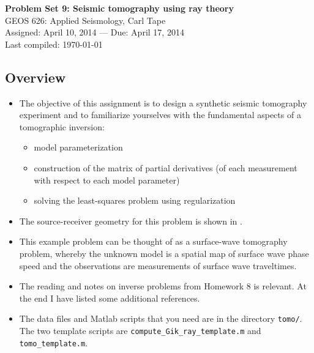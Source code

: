 \documentclass[11pt,titlepage,fleqn]{article}
\begin{document}

\begin{spacing}{1.2}
\begin{center}
{\large \bf Problem Set 9: Seismic tomography using ray theory} \\
GEOS 626: Applied Seismology, Carl Tape \\
Assigned: April 10, 2014 --- Due: April 17, 2014 \\
Last compiled: \today
\end{center}
\end{spacing}


\subsection*{Overview}

\begin{itemize}
\item The objective of this assignment is to design a synthetic seismic tomography experiment and to familiarize yourselves with the fundamental aspects of a tomographic inversion:
%
\begin{itemize}
\item model parameterization
\item construction of the matrix of partial derivatives (of each measurement with respect to each model parameter)
\item solving the least-squares problem using regularization
\end{itemize}

\item The source-receiver geometry for this problem is shown in .

\item This example problem can be thought of as a surface-wave tomography problem, whereby the unknown model is a spatial map of surface wave phase speed and the observations are measurements of surface wave traveltimes.

\item The reading and notes on inverse problems from Homework 8 is relevant.
At the end I have listed some additional references.
\nocite{Tape2007,Menke,Aster,Tarantola2005}

\item 
The data files and Matlab scripts that you need are in the directory \verb+tomo/+. The two template scripts are \verb+compute_Gik_ray_template.m+ and \verb+tomo_template.m+.

\end{itemize}
\end{document}
